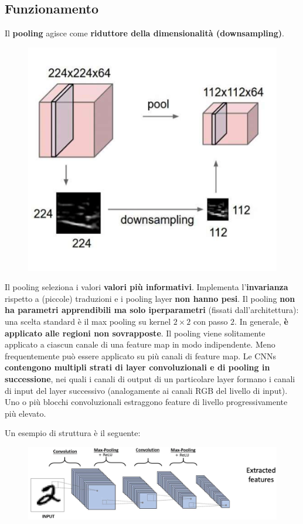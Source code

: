 \subsection{Funzionamento}
Il \textbf{pooling} agisce come \textbf{riduttore della dimensionalità (downsampling)}.
\begin{figure}[!h]
    \includegraphics[scale=.6]{images/cnn/pooling_function.png}
    \centering
\end{figure}


Il pooling seleziona i valori \textbf{valori più informativi}. Implementa l'\textbf{invarianza} rispetto a (piccole) traduzioni e i pooling layer \textbf{non hanno pesi}. Il pooling \textbf{non ha parametri apprendibili ma solo iperparametri} (fissati dall'architettura): una scelta standard è il max pooling su kernel $2\times2$ con passo $2$.
In generale, \textbf{è applicato alle regioni non sovrapposte}.
Il pooling viene solitamente applicato a ciascun canale di una feature map in modo indipendente.
Meno frequentemente può essere applicato su più canali di feature map.
\newpage
Le CNNs \textbf{contengono multipli strati di layer convoluzionali e di pooling in successione}, nei quali i canali di output di un particolare layer formano i canali di input del layer successivo (analogamente ai canali RGB del livello di input). Uno o più blocchi convoluzionali estraggono feature di livello progressivamente più elevato.


Un esempio di struttura è il seguente:
\begin{figure}[!h]
    \includegraphics[scale=.5]{images/cnn/ex01.png}
    \centering
\end{figure}



